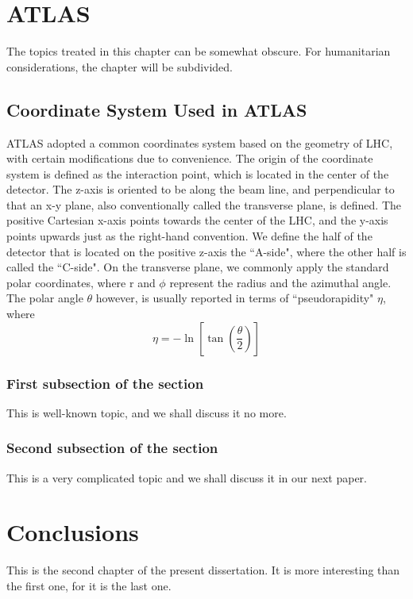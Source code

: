 \documentclass[final]{pittetd}%
\begin{document}
\chapter{ATLAS}
The topics treated in this chapter can be somewhat obscure. For humanitarian considerations, the chapter will be subdivided.
\section{Coordinate System Used in ATLAS}%
ATLAS adopted a common coordinates system based on the geometry of LHC, with certain modifications due to convenience. The origin of the coordinate system is defined as the interaction point, which is located in the center of the detector. The z-axis is oriented to be along the beam line, and perpendicular to that an x-y plane, also conventionally called the transverse plane, is defined. The positive Cartesian x-axis points towards the center of the LHC, and the y-axis points upwards just as the right-hand convention. We define the half of the detector that is located on the positive z-axis the ``A-side", where the other half is called the ``C-side". On the transverse plane, we commonly apply the standard polar coordinates, where r and $\phi$ represent the radius and the azimuthal angle. The polar angle $\theta$ however, is usually reported in terms of ``pseudorapidity" $\eta$, where 
\begin{equation}
\eta = -\ln[\tan(\frac{\theta}{2})]
\end{equation}

\subsection{First subsection of the section}
This is well-known topic, and we shall discuss it no more.
\subsection{Second subsection of the section}
This is a very complicated topic and we shall discuss it in our next paper.
\chapter{Conclusions}
This is the second chapter of the present dissertation. It is more interesting than the first one, for it is the last one.
%
%
\end{document}
